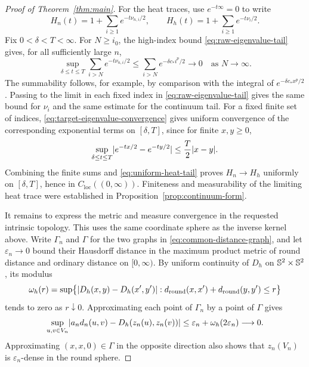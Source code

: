 \begin{proof}[Proof of Theorem~\ref{thm:main}]
For the heat traces, use \(e^{-t\infty}=0\) to write
\[
 H_n(t)=1+\sum_{i\ge1}e^{-t\nu_{n,i}/2},\qquad
 H_h(t)=1+\sum_{i\ge1}e^{-t\nu_i/2}.
\]
Fix \(0<\delta<T<\infty\).  For \(N\ge i_0\), the high-index bound
\eqref{eq:raw-eigenvalue-tail} gives, for all sufficiently large \(n\),
\begin{equation}\label{eq:uniform-heat-tail}
 \sup_{\delta\le t\le T}\sum_{i>N}e^{-t\nu_{n,i}/2}
 \le\sum_{i>N}e^{-\delta c_* i^p/2}\longrightarrow0
 \quad\text{as }N\to\infty.
\end{equation}
The summability follows, for example, by comparison with the integral of
\(e^{-\delta c_*x^p/2}\).  Passing to the limit in each fixed index in
\eqref{eq:raw-eigenvalue-tail} gives the same bound for \(\nu_i\) and the
same estimate for the continuum tail.  For a fixed finite set of indices,
\eqref{eq:target-eigenvalue-convergence} gives uniform convergence of the
corresponding exponential terms on \([\delta,T]\), since for finite
\(x,y\ge0\),
\[
 \sup_{\delta\le t\le T}\lvert e^{-tx/2}-e^{-ty/2}\rvert
 \le\frac T2\lvert x-y\rvert.
\]
Combining the finite sums and \eqref{eq:uniform-heat-tail} proves
\(H_n\to H_h\) uniformly on \([\delta,T]\), hence in
\(C_{\mathrm{loc}}((0,\infty))\).  Finiteness and measurability of the
limiting heat trace were established in Proposition~\ref{prop:continuum-form}.

It remains to express the metric and measure convergence in the requested
intrinsic topology.  This uses the same coordinate sphere as the inverse
kernel above.  Write \(\Gamma_n\) and \(\Gamma\) for the two graphs in
\eqref{eq:common-distance-graph}, and let \(\varepsilon_n\to0\) bound their
Hausdorff distance in the maximum product metric of round distance and
ordinary distance on \([0,\infty)\).  By uniform continuity of \(D_h\) on
\(\mathbb S^2\times\mathbb S^2\), its modulus
\[
 \omega_h(r)=\sup\bigl\{\lvert D_h(x,y)-D_h(x',y')\rvert:
 d_{\mathrm{round}}(x,x')+d_{\mathrm{round}}(y,y')\le r\bigr\}
\]
tends to zero as \(r\downarrow0\).  Approximating each point of
\(\Gamma_n\) by a point of \(\Gamma\) gives
\begin{equation}\label{eq:coordinate-distortion}
 \sup_{u,v\in V_n}
 \lvert a_nd_n(u,v)-D_h(z_n(u),z_n(v))\rvert
 \le\varepsilon_n+\omega_h(2\varepsilon_n)\longrightarrow0.
\end{equation}
Approximating \((x,x,0)\in\Gamma\) in the opposite direction also shows
that \(z_n(V_n)\) is \(\varepsilon_n\)-dense in the round sphere.


\end{proof}
